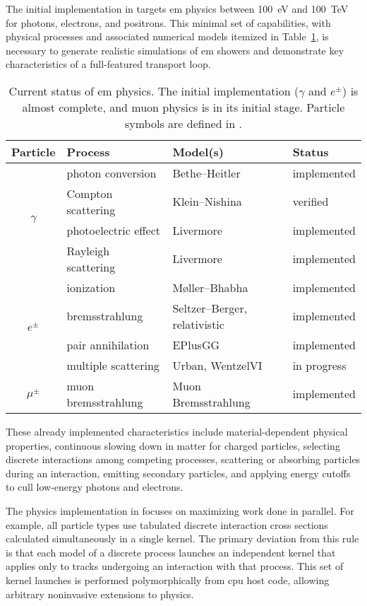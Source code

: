 The initial implementation in \celeritas targets \ac{em} physics between
\SI{100}{eV} and \SI{100}{TeV} for photons, electrons, and positrons. This
minimal set of capabilities, with physical processes and associated numerical
models itemized in Table~\ref{tab:em-physics}, is necessary to generate
realistic simulations of \ac{em} showers and demonstrate key characteristics of
a full-featured transport loop.
\begin{table}
  \caption{Current status of \celeritas \acs{em} physics. The initial
  implementation ($\gamma$ and $e^\pm$) is almost complete, and muon physics is
  in its initial stage. Particle symbols are defined in
  \textcite{tanabashi_review_2018}.}
  \label{tab:em-physics}
  \centering
  \begin{tabular}{clll}\toprule Particle & Process & Model(s) & Status\\
    \midrule
    \multirow{4}{*}{$\gamma$}
    & photon conversion & Bethe--Heitler & implemented\\
    & Compton scattering & Klein--Nishina & verified\\
    & photoelectric effect & Livermore & implemented\\
    & Rayleigh scattering & Livermore & implemented\\
    \midrule
    \multirow{4}{*}{$e^\pm$}
    & ionization & M\o{}ller--Bhabha & implemented\\
    & bremsstrahlung & Seltzer--Berger, relativistic & implemented\\
    & pair annihilation & EPlusGG & implemented\\
    & multiple scattering & Urban, WentzelVI & in progress\\
    \midrule
    $\mu^\pm$ & muon bremsstrahlung & Muon Bremsstrahlung & implemented\\
    \bottomrule
  \end{tabular}
\end{table}
These already implemented characteristics include  material-dependent
physical properties,  continuous slowing down in matter for charged
particles,  selecting discrete interactions among competing processes,
 scattering or absorbing particles during an interaction, 
emitting secondary particles, and  applying energy cutoffs to cull
low-energy photons and electrons.

The physics implementation in \celeritas focuses on maximizing work done in
parallel. For example, all particle types use tabulated discrete interaction
cross sections calculated simultaneously in a single kernel. The primary
deviation from this rule is that each model of a discrete process launches an
independent kernel that applies only to tracks undergoing an interaction with
that process. This set of kernel launches is performed polymorphically from
\ac{cpu} host code, allowing arbitrary noninvasive extensions to \celeritas
physics.

